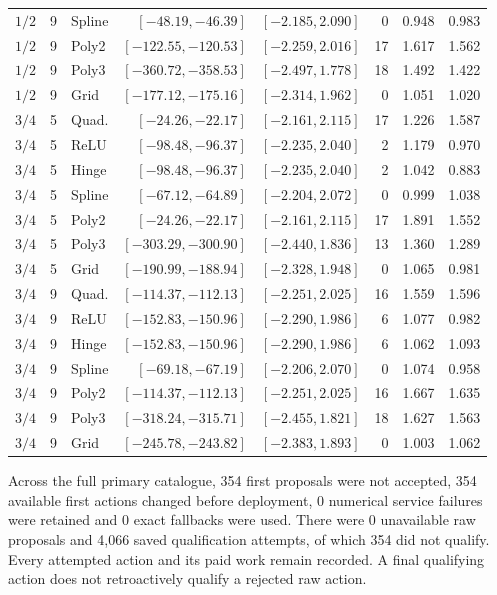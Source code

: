 \begin{longtable}{rrlrrrrr}
$1/2$ & 9 & Spline & $[-48.19,-46.39]$ & $[-2.185,2.090]$ & 0 & 0.948 & 0.983\\
$1/2$ & 9 & Poly2 & $[-122.55,-120.53]$ & $[-2.259,2.016]$ & 17 & 1.617 & 1.562\\
$1/2$ & 9 & Poly3 & $[-360.72,-358.53]$ & $[-2.497,1.778]$ & 18 & 1.492 & 1.422\\
$1/2$ & 9 & Grid & $[-177.12,-175.16]$ & $[-2.314,1.962]$ & 0 & 1.051 & 1.020\\
$3/4$ & 5 & Quad. & $[-24.26,-22.17]$ & $[-2.161,2.115]$ & 17 & 1.226 & 1.587\\
$3/4$ & 5 & ReLU & $[-98.48,-96.37]$ & $[-2.235,2.040]$ & 2 & 1.179 & 0.970\\
$3/4$ & 5 & Hinge & $[-98.48,-96.37]$ & $[-2.235,2.040]$ & 2 & 1.042 & 0.883\\
$3/4$ & 5 & Spline & $[-67.12,-64.89]$ & $[-2.204,2.072]$ & 0 & 0.999 & 1.038\\
$3/4$ & 5 & Poly2 & $[-24.26,-22.17]$ & $[-2.161,2.115]$ & 17 & 1.891 & 1.552\\
$3/4$ & 5 & Poly3 & $[-303.29,-300.90]$ & $[-2.440,1.836]$ & 13 & 1.360 & 1.289\\
$3/4$ & 5 & Grid & $[-190.99,-188.94]$ & $[-2.328,1.948]$ & 0 & 1.065 & 0.981\\
$3/4$ & 9 & Quad. & $[-114.37,-112.13]$ & $[-2.251,2.025]$ & 16 & 1.559 & 1.596\\
$3/4$ & 9 & ReLU & $[-152.83,-150.96]$ & $[-2.290,1.986]$ & 6 & 1.077 & 0.982\\
$3/4$ & 9 & Hinge & $[-152.83,-150.96]$ & $[-2.290,1.986]$ & 6 & 1.062 & 1.093\\
$3/4$ & 9 & Spline & $[-69.18,-67.19]$ & $[-2.206,2.070]$ & 0 & 1.074 & 0.958\\
$3/4$ & 9 & Poly2 & $[-114.37,-112.13]$ & $[-2.251,2.025]$ & 16 & 1.667 & 1.635\\
$3/4$ & 9 & Poly3 & $[-318.24,-315.71]$ & $[-2.455,1.821]$ & 18 & 1.627 & 1.563\\
$3/4$ & 9 & Grid & $[-245.78,-243.82]$ & $[-2.383,1.893]$ & 0 & 1.003 & 1.062\\
\end{longtable}
\endgroup


Across the full primary catalogue, 354 first proposals were not accepted, 354 available first actions changed before deployment, 0 numerical service failures were retained and 0 exact fallbacks were used. There were 0 unavailable raw proposals and 4,066 saved qualification attempts, of which 354 did not qualify. Every attempted action and its paid work remain recorded. A final qualifying action does not retroactively qualify a rejected raw action.

